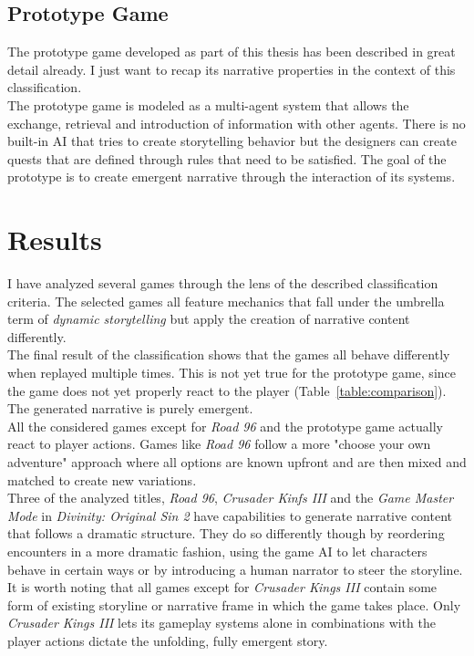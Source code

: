 \subsection{Prototype Game}
The prototype game developed as part of this thesis has been described in great detail already. I just want to recap its narrative properties in the context of this classification.\\
The prototype game is modeled as a multi-agent system that allows the exchange, retrieval and introduction of information with other agents. There is no built-in AI that tries to create storytelling behavior but the designers can create quests that are defined through rules that need to be satisfied. The goal of the prototype is to create emergent narrative through the interaction of its systems.
\section{Results}
I have analyzed several games through the lens of the described classification criteria. The selected games all feature mechanics that fall under the umbrella term of \textit{dynamic storytelling} but apply the creation of narrative content differently.\\
The final result of the classification shows that the games all behave differently when replayed multiple times. This is not yet true for the prototype game, since the game does not yet properly react to the player (Table~\ref{table:comparison}). The generated narrative is purely emergent.\\
All the considered games except for \textit{Road 96} and the prototype game actually react to player actions. Games like \textit{Road 96} follow a more "choose your own adventure" approach where all options are known upfront and are then mixed and matched to create new variations.\\
Three of the analyzed titles, \textit{Road 96}, \textit{Crusader Kinfs III} and the \textit{Game Master Mode} in \textit{Divinity: Original Sin 2} have capabilities to generate narrative content that follows a dramatic structure. They do so differently though by reordering encounters in a more dramatic fashion, using the game AI to let characters behave in certain ways or by introducing a human narrator to steer the storyline.\\
It is worth noting that all games except for \textit{Crusader Kings III} contain some form of existing storyline or narrative frame in which the game takes place. Only \textit{Crusader Kings III} lets its gameplay systems alone in combinations with the player actions dictate the unfolding, fully emergent story. 
